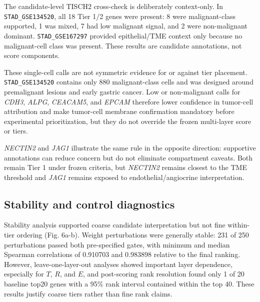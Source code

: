 \documentclass[review,12pt,authoryear]{elsarticle}
\begin{document}
The candidate-level TISCH2 cross-check is deliberately context-only. In \texttt{STAD\_\allowbreak{}GSE134520}, all 18 Tier 1/\allowbreak{}2 genes were present: 8 were malignant-class supported, 1 was mixed, 7 had low malignant signal, and 2 were non-malignant dominant. \texttt{STAD\_\allowbreak{}GSE167297} provided epithelial/\allowbreak{}TME context only because no malignant-cell class was present. These results are candidate annotations, not score components.

These single-cell calls are not symmetric evidence for or against tier placement. \texttt{STAD\_\allowbreak{}GSE134520} contains only 880 malignant-class cells and was designed around premalignant lesions and early gastric cancer. Low or non-malignant calls for \textit{CDH3}, \textit{ALPG}, \textit{CEACAM5}, and \textit{EPCAM} therefore lower confidence in tumor-cell attribution and make tumor-cell membrane confirmation mandatory before experimental prioritization, but they do not override the frozen multi-layer score or tiers.

\textit{NECTIN2} and \textit{JAG1} illustrate the same rule in the opposite direction: supportive annotations can reduce concern but do not eliminate compartment caveats. Both remain Tier 1 under frozen criteria, but \textit{NECTIN2} remains closest to the TME threshold and \textit{JAG1} remains exposed to endothelial/\allowbreak{}angiocrine interpretation.

\subsection{Stability and control diagnostics}

Stability analysis supported coarse candidate interpretation but not fine within-tier ordering (Fig. 6a-b). Weight perturbations were generally stable: 231 of 250 perturbations passed both pre-specified gates, with minimum and median Spearman correlations of 0.910703 and 0.983898 relative to the final ranking. However, leave-one-layer-out analyses showed important layer dependence, especially for $T$, $R$, and $E$, and post-scoring rank resolution found only 1 of 20 baseline top20 genes with a 95\% rank interval contained within the top 40. These results justify coarse tiers rather than fine rank claims.
\end{document}
